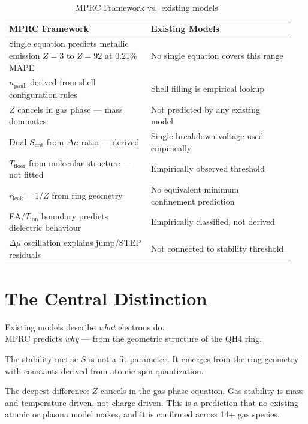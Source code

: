 \documentclass[12pt,a4paper]{article}
\theoremstyle{definition}
\begin{document}
\begin{table}[h!]
\centering
\caption{MPRC Framework vs.\ existing models}
\begin{tabular}{p{0.47\linewidth}p{0.47\linewidth}}
\toprule
\textbf{MPRC Framework}                                                        & \textbf{Existing Models}\\
\midrule
Single equation predicts metallic emission $Z=3$ to $Z=92$ at 0.21\% MAPE    & No single equation covers this range\\
$n_{\mathrm{pauli}}$ derived from shell configuration rules                    & Shell filling is empirical lookup\\
$Z$ cancels in gas phase --- mass dominates                                    & Not predicted by any existing model\\
Dual $S_{\mathrm{crit}}$ from $\Delta\mu$ ratio --- derived                   & Single breakdown voltage used empirically\\
$T_{\mathrm{floor}}$ from molecular structure --- not fitted                   & Empirically observed threshold\\
$r_{\mathrm{leak}} = 1/Z$ from ring geometry                                   & No equivalent minimum confinement prediction\\
EA/$T_{\mathrm{ion}}$ boundary predicts dielectric behaviour                   & Empirically classified, not derived\\
$\Delta\mu$ oscillation explains jump/STEP residuals                           & Not connected to stability threshold\\
\bottomrule
\end{tabular}
\end{table}

\section{The Central Distinction}

Existing models describe \emph{what} electrons do.\\
MPRC predicts \emph{why} --- from the geometric structure of the QH4 ring.

The stability metric $S$ is not a fit parameter. It emerges from the ring geometry with constants derived from atomic spin quantization.

The deepest difference: $Z$ cancels in the gas phase equation. Gas stability is mass and temperature driven, not charge driven. This is a prediction that no existing atomic or plasma model makes, and it is confirmed across 14+ gas species.
\end{document}
